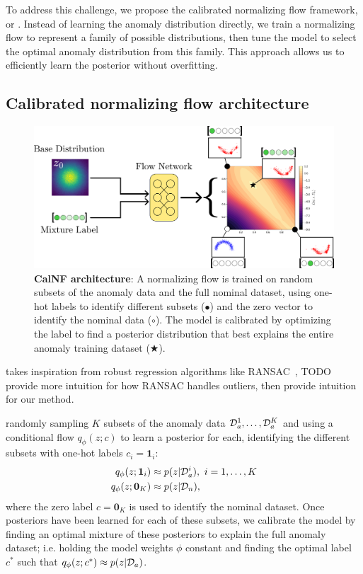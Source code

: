 To address this challenge, we propose the calibrated normalizing flow framework, or \ouralg{}. Instead of learning the anomaly distribution directly, we train a normalizing flow to represent a family of possible distributions, then tune the model to select the optimal anomaly distribution from this family. This approach allows us to efficiently learn the posterior without overfitting.

\subsection{Calibrated normalizing flow architecture}

\begin{figure}[htb]
    \centering
    \includegraphics[width=\linewidth]{images/icml/architecture.pdf}
    \caption{
        \textbf{CalNF architecture}: A normalizing flow is trained on random subsets of the anomaly data and the full nominal dataset, using one-hot labels to identify different subsets ($\bullet$) and the zero vector to identify the nominal data ($\circ$). The model is calibrated by optimizing the label to find a posterior distribution that best explains the entire anomaly training dataset ($\bigstar$).}
    \label{ch:icml:fig:architecture}
\end{figure}

\ouralg{} takes inspiration from robust regression algorithms like RANSAC~\cite{fischlerRandomSampleConsensus1981}, TODO provide more intuition for how RANSAC handles outliers, then provide intuition for our method.

\ouralg{} randomly sampling $K$ subsets of the anomaly data $\mathcal{D}_a^1, \ldots, \mathcal{D}_a^K$ and using a conditional flow $q_\phi(z; c)$ to learn a posterior for each, identifying the different subsets with one-hot labels $c_i = \mathbf{1}_i$:
\begin{align*}
    q_\phi(z; \mathbf{1}_i) & \approx p(z | \mathcal{D}_a^i),\ i=1,\ldots,K \\
    q_\phi(z; \mathbf{0}_K) & \approx p(z | \mathcal{D}_n),
\end{align*}
where the zero label $c = \mathbf{0}_K$ is used to identify the nominal dataset. Once posteriors have been learned for each of these subsets, we calibrate the model by finding an optimal mixture of these posteriors to explain the full anomaly dataset; i.e. holding the model weights $\phi$ constant and finding the optimal label $c^*$ such that $q_\phi(z; c^*) \approx p(z | \mathcal{D}_a)$.

